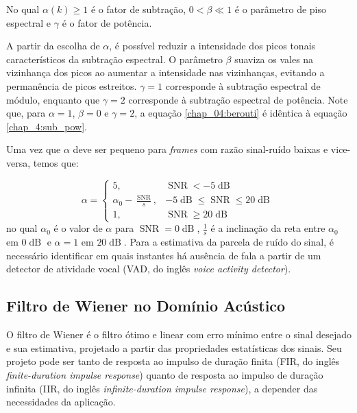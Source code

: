 No qual $\alpha(k) \geq 1$  é o fator de subtração, $0 < \beta \ll 1 $ é o
parâmetro de piso espectral\cite{berouti1979enhancement} e $\gamma$ é o fator de potência.

A partir da escolha de $\alpha$, é possível reduzir a intensidade dos picos
tonais característicos da subtração espectral. O parâmetro $\beta$ suaviza os
vales na vizinhança dos picos ao aumentar a intensidade nas vizinhanças,
evitando a permanência de picos estreitos.
$\gamma = 1$ corresponde
à subtração espectral de módulo, enquanto que $\gamma = 2$ corresponde à
subtração espectral de potência. Note que, para $\alpha = 1$, $\beta = 0$ e
$\gamma = 2$, a equação \eqref{chap_04:berouti} é idêntica à equação
\eqref{chap_4:sub_pow}.


Uma vez que $\alpha$ deve ser pequeno para \textit{frames} com razão sinal-ruído
baixas e vice-versa, temos que:

\begin{equation}
    \alpha = 
    \begin{cases}
        5, & \operatorname{SNR} < -5\operatorname{dB} \\
        \alpha_0 - \frac{\operatorname{SNR}}{s}, & -5\operatorname{dB} \leq \operatorname{SNR} \leq 20\operatorname{dB}\\
        1, & \operatorname{SNR} \geq 20\operatorname{dB}
    \end{cases}
\end{equation}
no qual $\alpha_0$ é o valor de $\alpha$ para $\operatorname{SNR} =
0\operatorname{dB}$, $\frac{1}{s}$ é a inclinação da reta entre $\alpha_0$ em
$0\operatorname{dB}$ e $\alpha = 1$ em $20\operatorname{dB}$. Para a estimativa da parcela de ruído do sinal, é
necessário identificar em quais instantes há ausência de fala a partir de um
detector de atividade vocal (VAD, do inglês \textit{voice activity detector}).


\subsection{Filtro de Wiener no Domínio Acústico}

O filtro de Wiener é o filtro ótimo e linear com erro mínimo entre o sinal
desejado e sua estimativa, projetado a partir das propriedades estatísticas dos
sinais. Seu projeto pode ser tanto de resposta ao impulso de duração finita (FIR,
do inglês \textit{finite-duration impulse response}) quanto de resposta ao
impulso de duração infinita (IIR, do inglês \textit{infinite-duration impulse
response}), a depender das necessidades da aplicação. \cite{loizou}

